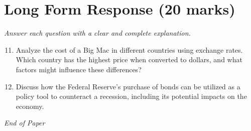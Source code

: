 \documentclass[12pt]{article}
\begin{document}
\section*{Long Form Response (20 marks)}
\textit{Answer each question with a clear and complete explanation.}
\begin{enumerate}[label=\arabic*.]
\setcounter{enumi}{10}
\item Analyze the cost of a Big Mac in different countries using exchange rates. Which country has the highest price when converted to dollars, and what factors might influence these differences?
\item Discuss how the Federal Reserve's purchase of bonds can be utilized as a policy tool to counteract a recession, including its potential impacts on the economy.
\end{enumerate}

\vfill
\noindent\textit{End of Paper}
\end{document}
